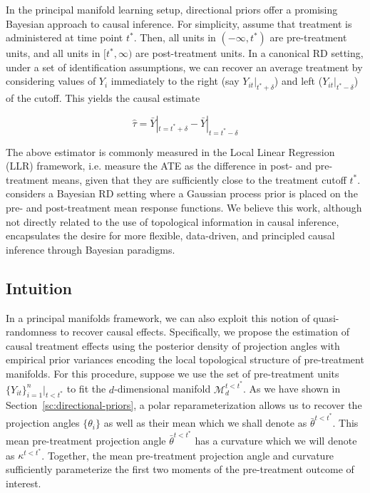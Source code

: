 \documentclass[twoside,11pt]{article}
\begin{document}
In the principal manifold learning setup, directional priors offer a promising Bayesian approach to causal inference. For simplicity, assume that treatment is administered at time point $t^*$. Then, all units in $(-\infty, t^*)$ are pre-treatment units, and all units in $[t^*, \infty)$ are post-treatment units. In a canonical RD setting, under a set of identification assumptions, we can recover an average treatment by considering values of $Y_i$ immediately to the right (say $Y_{it} |_{t^* + \delta}$) and left ($Y_{it} |_{t^* - \delta}$) of the cutoff. This yields the causal estimate  

$$
\hat{\tau}= \bar{Y}|_{t = t^* + \delta} - \bar{Y}|_{t = t^* - \delta} 
$$

The above estimator is commonly measured in the Local Linear Regression (LLR) framework, i.e. measure the ATE as the difference in post- and pre-treatment means, given that they are sufficiently close to the treatment cutoff $t^*$. \citet{Branson2019} considers a Bayesian RD setting where a Gaussian process prior is placed on the pre- and post-treatment mean response functions. We believe this work, although not directly related to the use of topological information in causal inference, encapsulates the desire for more flexible, data-driven, and principled causal inference through Bayesian paradigms.   

\subsection{Intuition}

In a principal manifolds framework, we can also exploit this notion of quasi-randomness to recover causal effects. Specifically, we propose the estimation of causal treatment effects using the posterior density of projection angles with empirical prior variances encoding the local topological structure of pre-treatment manifolds. For this procedure, suppose we use the set of pre-treatment units $\{Y_{it}\}_{i=1}^n|_{t < t^*}$ to fit the $d$-dimensional manifold $\mathcal{M}_d^{t < t^*}$. As we have shown in Section~\ref{sc:directional-priors}, a polar reparameterization allows us to recover the projection angles $\{\theta_i\}$ as well as their mean which we shall denote as $\bar{\theta}^{t < t^*}$. This mean pre-treatment projection angle $\bar{\theta}^{t < t^*}$ has a curvature which we will denote as $\kappa^{t<t^*}$. Together, the mean pre-treatment projection angle and curvature sufficiently parameterize the first two moments of the pre-treatment outcome of interest. 
\end{document}
